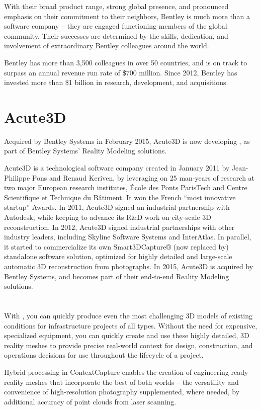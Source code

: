 With their broad product range, strong global presence, and pronounced emphasis on their commitment to their neighbors, Bentley is much more than a software company -- they are engaged functioning members of the global community. Their successes are determined by the skills, dedication, and involvement of extraordinary Bentley colleagues around the world.

Bentley has more than 3,500 colleagues in over 50 countries, and is on track to surpass an annual revenue run rate of \$700 million. Since 2012, Bentley has invested more than \$1 billion in research, development, and acquisitions.


\section{Acute3D}
Acquired by Bentley Systems in February 2015, Acute3D is now developing \CC, as part of Bentley Systems’ Reality Modeling solutions.

Acute3D is a technological software company created in January 2011 by Jean-Philippe Pons and Renaud Keriven, by leveraging on 25 man-years of research at two major European research institutes, École des Ponts ParisTech and Centre Scientifique et Technique du Bâtiment. It won the French “most innovative startup” Awards. In 2011, Acute3D signed an industrial partnership with Autodesk, while keeping to advance its R\&D work on city-scale 3D reconstruction. In 2012, Acute3D signed industrial partnerships with other industry leaders, including Skyline Software Systems and InterAtlas. In parallel, it started to commercialize its own Smart3DCapture® (now replaced by\CC) standalone software solution, optimized for highly detailed and large-scale automatic 3D reconstruction from photographs. In 2015, Acute3D is acquired by Bentley Systems, and becomes part of their end-to-end Reality Modeling solutions. 

\section{\CC}
With \CC, you can quickly produce even the most challenging 3D models of existing conditions for infrastructure projects of all types. Without the need for expensive, specialized equipment, you can quickly create and use these highly detailed, 3D reality meshes to provide precise real-world context for design, construction, and operations decisions for use throughout the lifecycle of a project. 

Hybrid processing in ContextCapture enables the creation of engineering-ready reality meshes that incorporate the best of both worlds -- the versatility and convenience of high-resolution photography supplemented, where needed, by additional accuracy of point clouds from laser scanning.

